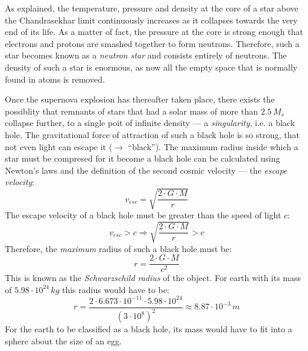 As explained, the temperature, pressure and density at the core of a star above the Chandrasekhar limit continuously increases as it collapses towards the very end of its life. As a matter of fact, the pressure at the core is strong enough that electrons and protons are smashed together to form neutrons. Therefore, such a star becomes known as a \emph{neutron star} and consists entirely of neutrons. The density of such a star is enormous, as now all the empty space that is normally found in atoms is removed.

Once the supernova explosion has thereafter taken place, there exists the possiblity that remnants of stars that had a solar mass of more than $2.5\, M_s$ collapse further, to a single poit of infinite density --- a \emph{singularity}, i.e. a black hole. The gravitational force of attraction of such a black hole is so strong, that not even light can escape it ($\rightarrow$ ``black''). The maximum radius inside which a star must be compresed for it become a black hole can be calculated using Newton's laws and the definition of the second cosmic velocity --- the \emph{escape velocity}: $$v_{esc} = \sqrt{\frac{2 \cdot G \cdot M}{r}}$$ The escape velocity of a black hole must be greater than the speed of light $c$: $$v_{esc} > c \Rightarrow \sqrt{\frac{2 \cdot G \cdot M}{r}} > c$$ Therefore, the \emph{maximum} radius of such a black hole must be: $$r = \frac{2 \cdot G \cdot M}{c^2}$$ This is known as the \emph{Schwarzschild radius} of the object. For earth with its mass of $5.98 \cdot 10^{24}\, kg$ this radius would have to be: $$r = \frac{2 \cdot 6.673 \cdot 10^{-11} \cdot 5.98 \cdot 10^{24}}{(3 \cdot 10^8)^2} \approx 8.87 \cdot 10^{-3} \, m$$ For the earth to be classified as a black hole, its mass would have to fit into a sphere about the size of an egg.

